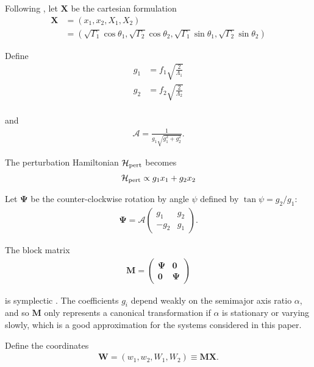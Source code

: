 \documentclass[usenatbib,onecolumn]{mnras}
\renewcommand{\v}[1]{\boldsymbol{ #1 }}
\begin{document}
Following \citep{henrard86_reduc_trans_apocen_librat}
\citep[or equivalently][]{wisdom_canonical_1986}, let \(\v X\) be the
cartesian formulation
\begin{align}
  \v X &= (x_1, x_2, X_1, X_2)\nonumber\\
  &= (\sqrt{\Gamma_1}\cos\theta_1, \sqrt{\Gamma_2}\cos\theta_2,
    \sqrt{\Gamma_1}\sin\theta_1, \sqrt{\Gamma_2}\sin\theta_2)
\end{align}

\noindent 
Define
\begin{align}
    g_1 &= f_1\sqrt{\frac{2}{\Lambda_1}} \\
    g_2 &= f_2\sqrt{\frac{2}{\Lambda_2}} \\
\end{align}

\noindent and
\begin{align}
  \mathcal{A} = \frac{1}{g_1\sqrt{g_1^2+g_2^2}}.
\end{align}

\noindent The perturbation Hamiltonian \(\mathcal H_{\rm
pert}\) becomes
\begin{align}
  \mathcal H_{\rm pert} \propto g_1 x_1 + g_2 x_2
\end{align}

\noindent
Let \(\v \Psi\) be the
counter-clockwise rotation by angle \(\psi\) defined by \(\tan\psi=
g_2/g_1\):
\begin{align}
  \v \Psi =  \mathcal{A}
  \begin{pmatrix}
    g_1 & g_2 \\
    -g_2 & g_1 
  \end{pmatrix}.
\end{align}

\noindent The block matrix
\begin{align}
  \v M =
  \begin{pmatrix}
    \v \Psi & \v 0 \\
    \v 0 & \v \Psi
  \end{pmatrix}
\end{align}

\noindent is symplectic \citep{goldstein_classical_2000}.
The coefficients \(g_i\) depend weakly on the semimajor axis ratio
\(\alpha\), and so \(\v M\) only represents a canonical transformation if
\(\alpha\) is stationary or varying slowly, which is a good
approximation for the systems considered in this paper.

Define the coordinates
\begin{align}
   \v W = (w_1, w_2, W_1, W_2) \equiv \v M \v X.
\end{align}
\end{document}
